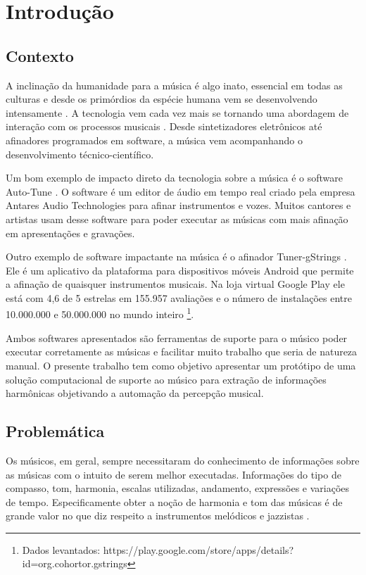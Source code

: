 \chapter[Introdução]{Introdução}
\label{chap:introducao}

\section{Contexto}
\label{sec:contexto}

A inclinação da humanidade para a música é algo inato, essencial em todas as culturas e desde os primórdios da espécie humana vem se desenvolvendo intensamente \cite{cruz2008necessidades}. A tecnologia vem cada vez mais se tornando uma abordagem de interação com os processos musicais \cite{makingmusictechnology}. Desde sintetizadores eletrônicos até afinadores programados em software, a música vem acompanhando o desenvolvimento técnico-científico.

Um bom exemplo de impacto direto da tecnologia sobre a música é o software Auto-Tune \cite{autotune}. O software é um editor de áudio em tempo real criado pela empresa Antares Audio Technologies \cite{autotune2} para afinar instrumentos e vozes. Muitos cantores e artistas usam desse software para poder executar as músicas com mais afinação em apresentações e gravações.

Outro exemplo de software impactante na música é o afinador Tuner-gStrings \cite{afinador}. Ele é um aplicativo da plataforma para dispositivos móveis Android que permite a afinação de quaisquer instrumentos musicais. Na loja virtual Google Play ele está com 4,6 de 5 estrelas em 155.957 avaliações e o número de instalações entre 10.000.000 e 50.000.000 no mundo inteiro \footnote{Dados levantados: https://play.google.com/store/apps/details?id=org.cohortor.gstrings}.

Ambos softwares apresentados são ferramentas de suporte para o músico poder executar corretamente as músicas e facilitar muito trabalho que seria de natureza manual. O presente trabalho tem como objetivo apresentar um protótipo de uma solução computacional de suporte ao músico para extração de informações harmônicas objetivando a automação da percepção musical.


\section{Problemática}
\label{sec:problematica}

Os músicos, em geral, sempre necessitaram do conhecimento de informações sobre as músicas com o intuito de serem melhor executadas. Informações do tipo de compasso, tom, harmonia, escalas utilizadas, andamento, expressões e variações de tempo. Especificamente obter a noção de harmonia e tom das músicas é de grande valor no que diz respeito a instrumentos melódicos e jazzistas \cite{jazzistas}.

